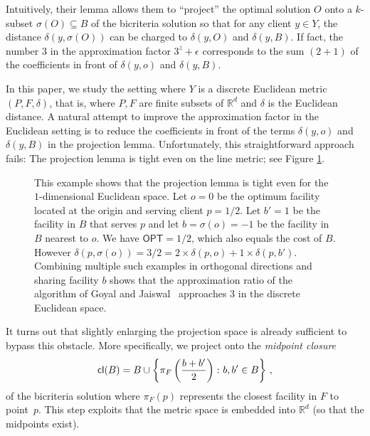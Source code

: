 \documentclass[11pt]{article}
\newcommand{\opt}{\ensuremath{\textsf{OPT}}}
\newcommand{\bRd}{\ensuremath{\mathbb{R}^d}\xspace}
\begin{document}
Intuitively, their lemma allows them to ``project'' the optimal solution $O$ onto a $k$-subset $\sigma(O) \subseteq B$ of the bicriteria solution so that for any client $y\in Y$, the distance $\delta(y,\sigma(O))$ can be charged to $\delta(y,O)$ and $\delta(y,B)$. If fact, the  number $3$ in the approximation factor $3^z+\epsilon$ corresponds to the sum $(2+1)$ of the coefficients in front of $\delta(y,o)$ and $\delta(y,B)$.


In this paper, we study the setting where $Y$ is a discrete Euclidean metric $(P,F,\delta)$, that is, where $P,F$ are finite subsets of $\bRd$ and $\delta$ is the Euclidean distance. A natural attempt to improve the approximation factor in the Euclidean setting is to reduce the coefficients in front of the terms $\delta(y,o)$ and $\delta(y,B)$ in the projection lemma. Unfortunately, this straightforward approach fails: The projection lemma is tight even on the line metric; see Figure \ref{pic:tight}.

\begin{figure}[!ht]

    \centering
    \tikzVI
    \vspace{4ex}
    \caption{\footnotesize This example shows that the projection lemma is tight even for the $1$-dimensional Euclidean space.
    Let $o=0$ be the optimum facility located at the origin and serving client $p=1/2$. Let $b'=1$ be the facility in $B$ that serves $p$ and let $b=\sigma(o)=-1$ be the facility in $B$ nearest to $o$. We have $\opt=1/2$, which also equals the cost of $B$. However $\delta(p,\sigma(o))=3/2=2\times \delta(p,o) + 1\times \delta(p,b')$. Combining multiple such examples in orthogonal directions and sharing facility $b$ shows that the approximation ratio of the algorithm of Goyal and Jaiswal~\cite{goyal2021tight} approaches $3$ in the discrete Euclidean space.}
  \label{pic:tight} 
\end{figure}

It turns out that slightly enlarging the projection space is already sufficient to bypass this obstacle. More specifically, we project onto the \emph{midpoint closure}
\begin{equation}\label{eq:midpt-closure}
  {\sf cl}(B) = B \cup \left\{\pi_F\left(\frac{b+b'}{2}\right)\colon b, b' \in B\right\}\, ,
\end{equation}
 of the bicriteria solution where $\pi_F(p)$ represents the closest facility in $F$ to point~$p$. This step exploits that the metric space is embedded into $\bRd$ (so that the midpoints exist).
\end{document}
